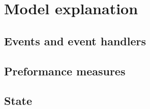 \section{Model explanation}

\subsection{Events and event handlers}

\subsection{Preformance measures}

\subsection{State}